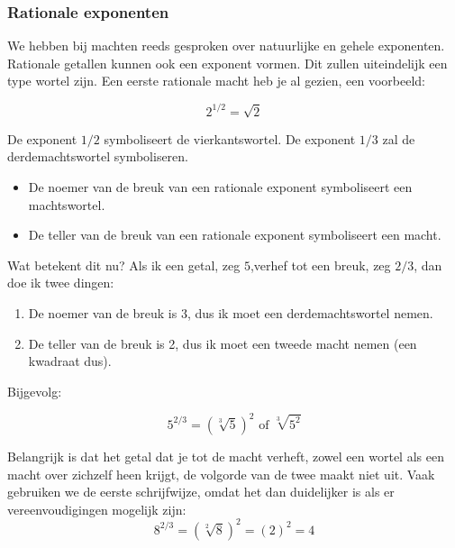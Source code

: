 \subsubsection{Rationale exponenten}

We hebben bij machten reeds gesproken over natuurlijke en gehele exponenten. Rationale getallen kunnen ook een exponent vormen. Dit zullen uiteindelijk een type wortel zijn. Een eerste rationale macht heb je al gezien, een voorbeeld:

\begin{equation*}
2^{1/2}=\sqrt{2}
\end{equation*}

De exponent $1/2$ symboliseert de vierkantswortel. De exponent $1/3$ zal de derdemachtswortel symboliseren.


\begin{definitie}
	
\begin{itemize}
\item De noemer van de breuk van een rationale exponent symboliseert een machtswortel.
\item De teller van de breuk van een rationale exponent symboliseert een macht.
\end{itemize}
\end{definitie}

Wat betekent dit nu? Als ik een getal, zeg $5$,verhef tot een breuk, zeg $2/3$, dan doe ik twee dingen:

\begin{enumerate}
	\item De noemer van de breuk is 3, dus ik moet een derdemachtswortel nemen.
	\item De teller van de breuk is 2, dus ik moet een tweede macht nemen (een kwadraat dus).
\end{enumerate}

Bijgevolg:

\begin{equation*}
5^{2/3} = (\sqrt[3]{5})^2 \text{ of } \sqrt[3]{5^2}
\end{equation*}

Belangrijk is dat het getal dat je tot de macht verheft, zowel een wortel als een macht over zichzelf heen krijgt, de volgorde van de twee maakt niet uit. Vaak gebruiken we de eerste schrijfwijze, omdat het dan duidelijker is als er vereenvoudigingen mogelijk zijn:
\begin{equation*}
8^{2/3} = (\sqrt[2]{8})^2 = (2)^2 = 4
\end{equation*}

